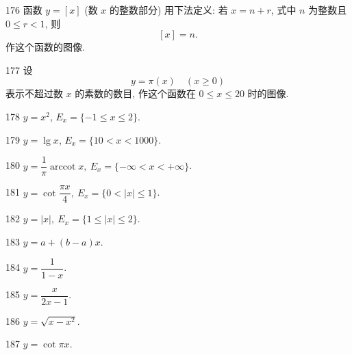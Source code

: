 \begin{prob}[M]{176}
函数 $y = [x]$ (数 $x$ 的整数部分) 用下法定义: 若 $x = n + r$, 式中 $n$ 为整数且 $0 \leqslant r < 1$, 则
\[
[x] = n.
\]
作这个函数的图像.
\end{prob}

\begin{prob}[M]{177}
设
\[
y = \pi(x) \quad (x \geqslant 0)
\]
表示不超过数 $x$ 的素数的数目, 作这个函数在 $0 \leqslant x \leqslant 20$ 时的图像.
\end{prob}


\begin{prob}[S]{178}
$y = x^2$, $E_x = \{-1 \leqslant x \leqslant 2\}$.
\end{prob}

\begin{prob}[S]{179}
$y = \lg x$, $E_x = \{10 < x < 1000\}$.
\end{prob}

\begin{prob}[S]{180}
$y = \dfrac{1}{\pi}\operatorname{arccot} x,\ E_x = \{-\infty < x < +\infty\}$.
\end{prob}

\begin{prob}[S]{181}
$y = \cot\dfrac{\pi x}{4},\ E_x = \{0 < |x| \leqslant 1\}$.
\end{prob}

\begin{prob}[S]{182}
$y = |x|,\ E_x = \{1 \leqslant |x| \leqslant 2\}$.
\end{prob}


\begin{prob}[S]{183}
$y = a + (b - a)x$.
\end{prob}

\begin{prob}[S]{184}
$y = \dfrac{1}{1 - x}$.
\end{prob}

\begin{prob}[S]{185}
$y = \dfrac{x}{2x - 1}$.
\end{prob}

\begin{prob}[S]{186}
$y = \sqrt{x - x^2}$.
\end{prob}

\begin{prob}[S]{187}
$y = \cot\pi x$.
\end{prob}

